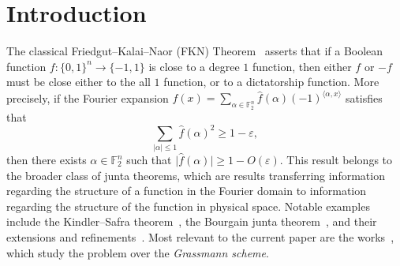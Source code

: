 \documentclass[11pt]{article}
\newcommand\card[1]{\left| {#1} \right|}
\newcommand\inner[2]{\langle{#1},{#2}\rangle}
\newcommand\eps{\varepsilon}
\renewcommand\geq{\geqslant}
\renewcommand\leq{\leqslant}
\providecommand{\sqbinom}[2]{\genfrac{[}{]}{0pt}{}{#1}{#2}}
\begin{document}
\maketitle
\begin{abstract}
A classical theorem due to Friedgut, Kalai and Naor asserts that if a function $f\colon \{0,1\}^n\to\{-1,1\}$ close to a degree $1$ function, then either $f$ or $-f$ is close to either the all $1$ function, or to $(-1)^{x_i}$ for some $i\in [n]$. We prove a version of their theorem for the Grassmann scheme over $\mathbb{F}_2$. More precisely, we prove if a function $f\colon \sqbinom{\mathbb{F}_2^n}{\ell}\to\{0,1\}$ is close to a degree $1$ function, then either $f$ or $1-f$ must be close to a function of the form $g(L) = \sum\limits_{x\in\mathcal{X}}1_{x\in L}+\sum\limits_{W\in\mathcal{W}}1_{L\subseteq W}$, where $\mathcal{X}\subseteq\mathbb{F}_2^n$ is a set of points and $\mathcal{W}$ is a set of hyperplanes in $\mathbb{F}_2^n$.
\end{abstract}
\section{Introduction}
The classical Friedgut--Kalai--Naor (FKN) Theorem~\cite{friedgut2002boolean} asserts that if a Boolean function $f\colon \{0,1\}^n\to\{-1,1\}$ is close to a degree $1$ function, then either $f$ or $-f$ must be close either to the all $1$ function, or to a dictatorship function. More precisely, if the Fourier expansion $f(x) = \sum\limits_{\alpha\in\mathbb{F}_2^n}\widehat{f}(\alpha)(-1)^{\inner{\alpha}{x}}$ satisfies that 
\[
\sum\limits_{\card{\alpha}\leq 1} \widehat{f}(\alpha)^2\geq 1-\eps,
\]
then there exists $\alpha\in\mathbb{F}_2^n$ such that $\lvert\widehat{f}(\alpha)\rvert\geq 1-O(\eps)$. This result belongs to the broader class of junta theorems, which are results transferring information regarding the structure of a function in the Fourier domain to information regarding the structure of the function in physical space. Notable examples include the Kindler--Safra theorem~\cite{KS}, the Bourgain junta theorem~\cite{Bourgain2002FourierSpectrum}, and their extensions and refinements~\cite{AlonDinurFriedgutSudakov2004,DinurFriedgutKindlerODonnell2007,JendrejOleszkiewiczWojtaszczyk2012,RubinsteinSafra2015,EFF1,EFF2,EFF3,Filmus2020FKNMultislice,Filmus2021BooleanSn,EldanKindlerLifshitzMinzer2025}. Most relevant to the current paper are the works~\cite{FilmusIhringer,Ihringer2023Classification,Filmus2026Grassmann}, which study the problem over the \emph{Grassmann scheme}.
\end{document}
